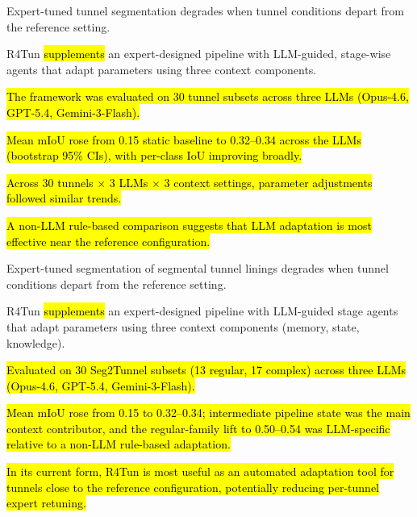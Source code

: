 \documentclass[a4paper,fleqn]{cas-dc}
\begin{document}
{%

\begin{highlights}

\item Expert-tuned tunnel segmentation degrades when tunnel conditions depart from the reference setting.
\item R4Tun \hl{supplements} an expert-designed pipeline with LLM-guided, stage-wise agents that adapt parameters using three context components.
\item \hl{The framework was evaluated on 30 tunnel subsets across three LLMs (Opus-4.6, GPT-5.4, Gemini-3-Flash).}
\item \hl{Mean mIoU rose from 0.15 static baseline to 0.32--0.34 across the LLMs (bootstrap 95\% CIs), with per-class IoU improving broadly.}
\item \hl{Across 30 tunnels $\times$ 3 LLMs $\times$ 3 context settings, parameter adjustments followed similar trends.}
\item \hl{A non-LLM rule-based comparison suggests that LLM adaptation is most effective near the reference configuration.}



\end{highlights}

\begin{highlights}
\item Expert-tuned segmentation of segmental tunnel linings degrades when tunnel conditions depart from the reference setting.
\item R4Tun \hl{supplements} an expert-designed pipeline with LLM-guided stage agents that adapt parameters using three context components (memory, state, knowledge).
\item \hl{Evaluated on 30 Seg2Tunnel subsets (13 regular, 17 complex) across three LLMs (Opus-4.6, GPT-5.4, Gemini-3-Flash).}
\item \hl{Mean mIoU rose from 0.15 to 0.32--0.34; intermediate pipeline state was the main context contributor, and the regular-family lift to 0.50--0.54 was LLM-specific relative to a non-LLM rule-based adaptation.}
\item \hl{In its current form, R4Tun is most useful as an automated adaptation tool for tunnels close to the reference configuration, potentially reducing per-tunnel expert retuning.}
\end{highlights}


}
\end{document}
